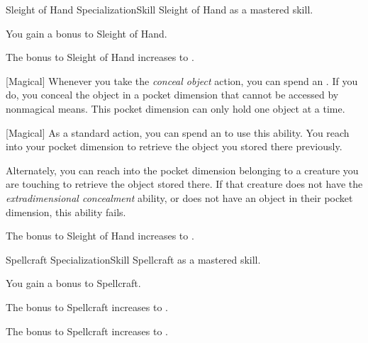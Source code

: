    \begin{feat}{Sleight of Hand Specialization}{Skill}
        \featpre Sleight of Hand as a mastered skill.
        \featben

         You gain a  bonus to Sleight of Hand.

        \ff[2]{}

         The bonus to Sleight of Hand increases to .

        [Magical] Whenever you take the \textit{conceal object} action, you can spend an .
        If you do, you conceal the object in a pocket dimension that cannot be accessed by nonmagical means.
        This pocket dimension can only hold one object at a time.

        [Magical] As a standard action, you can spend an  to use this ability.
        You reach into your pocket dimension to retrieve the object you stored there previously.

        Alternately, you can reach into the pocket dimension belonging to a creature you are touching to retrieve the object stored there.
        If that creature does not have the \textit{extradimensional concealment} ability, or does not have an object in their pocket dimension, this ability fails.

         The bonus to Sleight of Hand increases to .
    \end{feat}

    \begin{feat}{Spellcraft Specialization}{Skill}
        \featpre Spellcraft as a mastered skill.
        \featben

         You gain a  bonus to Spellcraft.

         The bonus to Spellcraft increases to .

         The bonus to Spellcraft increases to .
    \end{feat}

